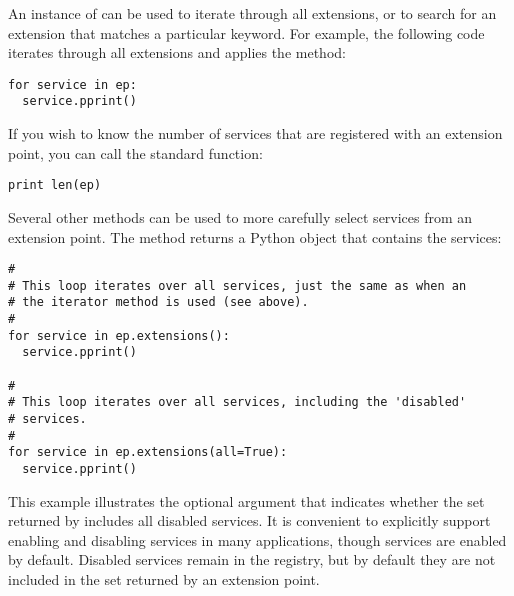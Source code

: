 An instance of  can be used to iterate through
all extensions, or to search for an extension that matches a particular
keyword. For example, the following code iterates through all extensions
and applies the  method:
\begin{lstlisting}
for service in ep:
  service.pprint()
\end{lstlisting}
If you wish to know the number of services that are registered with an
extension point, you can call the standard  function:
\begin{lstlisting}
print len(ep)
\end{lstlisting}
Several other methods can be used to more carefully select services from
an extension point. The  method returns a Python  object
that contains the services:
\begin{lstlisting}
#
# This loop iterates over all services, just the same as when an
# the iterator method is used (see above).
#
for service in ep.extensions():
  service.pprint()

#
# This loop iterates over all services, including the 'disabled'
# services.
#
for service in ep.extensions(all=True):
  service.pprint()
\end{lstlisting}
This example illustrates the optional argument that indicates whether
the set returned by  includes all disabled services. It is
convenient to explicitly support enabling and disabling services in many
applications, though services are enabled by default. Disabled services
remain in the registry, but by default they are not included in the set
returned by an extension point.

